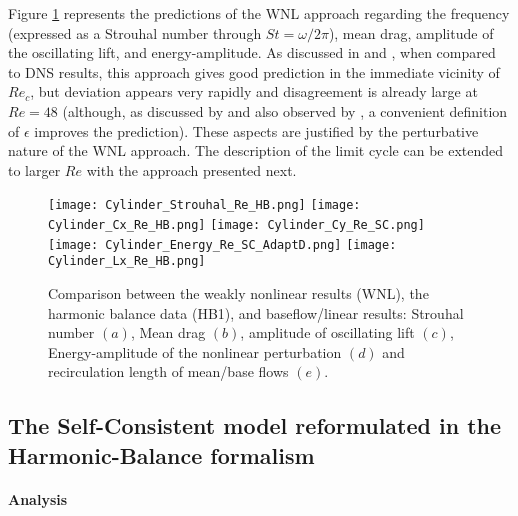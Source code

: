 \documentclass[twocolumn,10pt]{asme2ej}
\begin{document}
Figure \ref{fig:HB_SC_DATA_COMP} represents the predictions of the WNL approach regarding the frequency (expressed as a Strouhal number through $St = \omega/2\pi$), mean drag, amplitude of the oscillating lift, and energy-amplitude.
As discussed in \cite{SippLebedev} and \cite{FDR2016},  when compared to DNS results, this approach gives good prediction in the immediate vicinity of $Re_c$, but deviation appears very rapidly and disagreement is already large at $Re=48$ (although, as discussed by \cite{FDR2016} and also observed by \cite{Tchoufag2015}, a convenient definition of $\epsilon$ improves the prediction). 
 These aspects are justified by the perturbative nature of the WNL approach. The description of the limit cycle can be extended to larger $Re$ with the approach presented next.  

\begin{figure}
\begin{center}
\texttt{[image: Cylinder\_Strouhal\_Re\_HB.png]}
\texttt{[image: Cylinder\_Cx\_Re\_HB.png]}
\texttt{[image: Cylinder\_Cy\_Re\_SC.png]}
\texttt{[image: Cylinder\_Energy\_Re\_SC\_AdaptD.png]}
\texttt{[image: Cylinder\_Lx\_Re\_HB.png]}
\end{center}
\caption{Comparison between the weakly nonlinear results (WNL), the harmonic balance data (HB1), and baseflow/linear results: Strouhal number $(a)$, Mean drag $(b)$, amplitude of oscillating lift $(c)$, Energy-amplitude of the nonlinear perturbation $(d)$ and recirculation length of mean/base flows $(e)$. 
}
\label{fig:HB_SC_DATA_COMP}
\end{figure}



\subsection{The Self-Consistent model reformulated in the Harmonic-Balance formalism }
\paragraph{Analysis}

\end{document}
